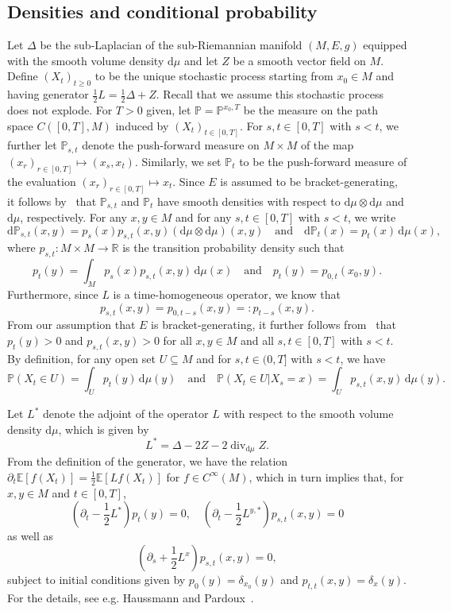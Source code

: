 \documentclass[10pt]{amsart}
\theoremstyle{remark}
\newcommand{\E}{\mathbb{E}}
\newcommand{\pp}{\mathbb{P}}
\DeclareMathOperator{\dv}{div}
\newcommand{\R}{\mathbb{R}}
\newcommand{\dd}{\,{\mathrm d}}
\newcommand{\db}{{\mathrm d}}
\numberwithin{equation}{section}
\begin{document}
\subsection{Densities and conditional probability}
Let $\Delta$ be the sub-Laplacian of the sub-Riemannian manifold $(M, E,g)$ equipped with the smooth volume density $\db\mu$ and let $Z$ be a smooth vector field on $M$. Define $(X_t)_{t\geq 0}$ to be the unique stochastic process starting from $x_0\in M$ and having generator $\frac{1}{2} L = \frac{1}{2} \Delta + Z$. Recall that we assume this stochastic process does not explode.
For $T>0$ given, let $\pp=\pp^{x_0,T}$ be the measure on the path space $C([0,T], M)$ induced by $(X_{t})_{t\in [0,T]}$. For $s,t\in[0,T]$ with $s<t$, we further let $\pp_{s,t}$ denote the push-forward measure on $M \times M$ of the map $(x_{r})_{r \in [0,T]} \mapsto (x_s, x_t)$. Similarly, we set $\pp_t$ to be the push-forward measure of the evaluation $(x_{r})_{r \in [0,T]} \mapsto x_t$.
Since $E$ is assumed to be bracket-generating, it follows by~\cite{Hor67,StVa72} that $\pp_{s,t}$ and $\pp_t$ have smooth densities with respect to $\db\mu \otimes \db \mu$ and $\db \mu$, respectively.
For any $x,y\in M$ and for any $s,t\in[0,T]$ with $s<t$, we write
$$\db\pp_{s,t}(x,y) = p_s(x) p_{s,t}(x,y) (\db\mu \otimes \db\mu)(x,y)
\quad\text{and}\quad \db\pp_t(x) = p_t(x) \dd\mu(x),$$
where $p_{s,t}\colon M\times M\to\R$ is the transition probability density such that
\begin{equation*}
p_t(y)  =\int_M p_s(x) p_{s,t}(x,y) \dd\mu(x) \quad\text{and}\quad p_t(y) = p_{0,t}(x_0,y).
\end{equation*}
Furthermore, since $L$ is a time-homogeneous operator, we know that
$$p_{s,t}(x,y) = p_{0,t-s}(x,y) =: p_{t-s}(x,y).$$
From our assumption that $E$ is bracket-generating, it further follows from~\cite{StVa72} that $p_t(y) > 0$ and $p_{s,t}(x,y) >0$ for all $x,y\in M$ and all $s,t\in[0,T]$ with $s<t$. By definition, for any open set $U\subseteq M$ and for $s,t\in(0,T]$ with $s<t$, we have
$$\pp(X_t \in U) = \int_{U} p_t(y) \dd\mu(y)
\quad\text{and}\quad \pp(X_t \in U | X_s =x) = \int_U p_{s,t}(x,y) \dd\mu(y).$$

Let $L^*$ denote the adjoint of the operator $L$ with respect to the smooth volume density $\db \mu$, which is given by
\begin{displaymath}
    L^* = \Delta - 2Z - 2\dv_{\db\mu} Z.
\end{displaymath}
From the definition of the generator, we have the relation
$\partial_t \E[f(X_t)] = \frac{1}{2} \E[Lf(X_t)]$ for $f\in C^\infty(M)$, which in turn implies that, for $x,y\in M$ and $t\in[0,T]$,
\begin{displaymath}
    \left(\partial_t- \frac{1}{2} L^*\right) p_t(y) = 0, \quad \left(\partial_t - \frac{1}{2} L^{y,*}\right) p_{s,t}(x,y) =0
\end{displaymath}
as well as
\begin{equation}\label{eq:3rdidentity}
    \left(\partial_s + \frac{1}{2} L^x\right) p_{s,t}(x,y) = 0,
\end{equation}
subject to initial conditions given by $p_0(y) = \delta_{x_0}(y)$ and $p_{t,t} (x,y)= \delta_x(y)$. For the details, see e.g. Haussmann and Pardoux~\cite[p.~1191]{haussmann1986time}. 
\end{document}
